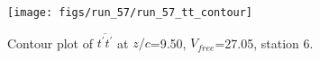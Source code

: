 \begin{figure}[H]
\centering
\texttt{[image: figs/run\_57/run\_57\_tt\_contour]}
\caption{Contour plot of $\overline{t^\prime t^\prime}$ at $z/c$=9.50, $V_{free}$=27.05, station 6.}
\end{figure}


